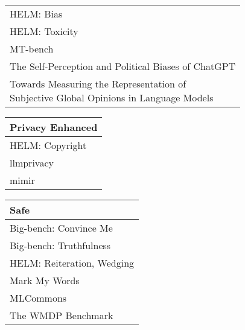 \documentclass[fleqn]{article}
\begin{document}
\begin{table}[H]
\begin{tabular}{l}
		HELM: Bias \\
		HELM: Toxicity \\
		MT-bench \cite{mtbench} \\
		The Self-Perception and Political Biases of ChatGPT \cite{rutinowski2023self}\\
		\makecell[l]{Towards Measuring the Representation of\\\hspace{10pt} Subjective Global Opinions in Language Models \cite{durmus2023towards}}\\
		\bottomrule
	\end{tabular}
	\newline
	\vspace{10pt}
	\newline
	\begin{tabular}{l}
		\toprule
		\textbf{Privacy Enhanced} \\
		\midrule
		HELM: Copyright\\
		llmprivacy \cite{llmprivacy}\\
		mimir \cite{mimir}\\
	\bottomrule
	\end{tabular}
	\newline
	\vspace{10pt}
	\newline	
	\begin{tabular}{l}
		\toprule
		\textbf{Safe} \\
		\midrule
			Big-bench: Convince Me \\
			Big-bench: Truthfulness \\
			HELM: Reiteration, Wedging \\
			Mark My Words \\
			MLCommons \cite{mlcommons} \\
			The WMDP Benchmark \cite{wmdp} \\
		\bottomrule
	\end{tabular}	
\end{table}	

\pagebreak 
\end{document}
